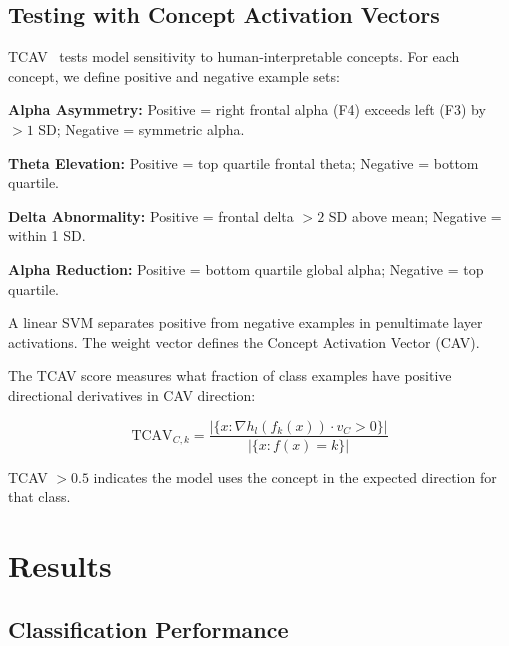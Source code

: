 \documentclass[blue,fullpaper]{ludusofficial}  %
\begin{document}
\subsection{Testing with Concept Activation Vectors}

TCAV~\cite{kim2018interpretability} tests model sensitivity to human-interpretable concepts. For each concept, we define positive and negative example sets:

\textbf{Alpha Asymmetry:} Positive = right frontal alpha (F4) exceeds left (F3) by $>1$ SD; Negative = symmetric alpha.

\textbf{Theta Elevation:} Positive = top quartile frontal theta; Negative = bottom quartile.

\textbf{Delta Abnormality:} Positive = frontal delta $>2$ SD above mean; Negative = within 1 SD.

\textbf{Alpha Reduction:} Positive = bottom quartile global alpha; Negative = top quartile.

A linear SVM separates positive from negative examples in penultimate layer activations. The weight vector defines the Concept Activation Vector (CAV).

The TCAV score measures what fraction of class examples have positive directional derivatives in CAV direction:

\begin{equation}
\text{TCAV}_{C,k} = \frac{|\{x : \nabla h_l(f_k(x)) \cdot v_C > 0\}|}{|\{x : f(x) = k\}|}
\end{equation}

TCAV $> 0.5$ indicates the model uses the concept in the expected direction for that class.

\section{Results}

\subsection{Classification Performance}
\end{document}
